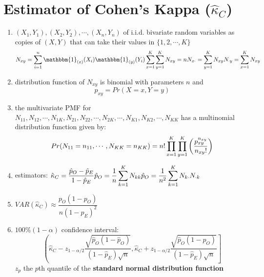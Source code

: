 \section{Estimator of Cohen’s Kappa ($\hat{\kappa}_C$) \cite{ism-1}} \label{Multivariate Distributions: Estimator of Cohen’s Kappa}


\begin{enumerate}
    \item $(X_1, Y_1), (X_2, Y_2), \cdots , (X_n, Y_n)$ of i.i.d. bivariate random variables as copies of $(X, Y)$ that can take their values in $\{1, 2,\cdots, K\}$
    \[
        \hfill
        N_{xy} = \dsum_{i=1}^{n}
        \mathbbm{1}_{(x)}(X_i) \mathbbm{1}_{(y)}(Y_i)
        \hfill
        \dsum_{x=1}^{K} \dsum_{y=1}^{K} N_{xy} = n
        \hfill
        N_{x\cdot} = \dsum_{y=1}^{K} N_{xy}
        \hfill
        N_{\cdot y} = \dsum_{x=1}^{K} N_{xy}
        \hfill
    \]

    \item distribution function of $N_{xy}$ is binomial with parameters $n$ and 
    \[
        p_{xy} = Pr(X = x, Y = y)
    \]

    \item the multivariate PMF for $N_{11}, N_{12},\cdots, N_{1K}, N_{21}, N_{22},\cdots, N_{2K} , \cdots, N_{K1}, N_{K2},\cdots, N_{KK}$ has a multinomial distribution function given by:
    \[
        Pr(N_{11}=n_{11},\cdots,N_{KK}=n_{KK})
        = n!\displaystyle\prod_{x=1}^{K} \displaystyle\prod_{y=1}^{K}
        \left( \dfrac{p_{xy}^{n_{xy}}}{n_{xy}!} \right)
    \]

    \item estimators: $
        \hfill
        \hat{\kappa}_C = \dfrac{\hat{p}_O - \hat{p}_E}{1 - \hat{p}_E}
        \hfill
        \hat{p}_O = \dfrac{1}{n} \dsum_{k=1}^K N_{kk}
        \hfill
        \hat{p}_O = \dfrac{1}{n^2} \dsum_{k=1}^K 
        N_{k\cdot}N_{\cdot k}
        \hfill
    $
    
    \item $
        VAR(\hat{\kappa}_C)
        \approx \dfrac{p_O(1 - p_O)}{n(1 - p_E)^2}
    $

    \item $100\%(1 - \alpha)$ confidence interval:
    \[\left(
        \hat{\kappa}_C - z_{1-\alpha/2}
        \dfrac{\sqrt{\hat{p}_O(1-\hat{p}_O)}}{(1 - \hat{p}_E)\sqrt{n}},
        \hat{\kappa}_C + z_{1-\alpha/2}
        \dfrac{\sqrt{\hat{p}_O(1-\hat{p}_O)}}{(1 - \hat{p}_E)\sqrt{n}}
    \right]\]
    $z_p$ the $p$th quantile of the \textbf{standard normal distribution function}

    
\end{enumerate}

